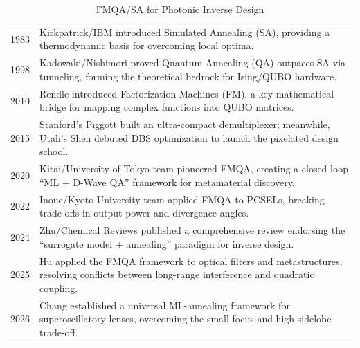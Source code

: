 \begin{table}[H] 
\centering
\begin{tabularx}{\textwidth}{l | >{\linespread{1.0}\selectfont\arraybackslash}X}
\hline \rule{0pt}{1.8em}1983 & Kirkpatrick/IBM introduced Simulated Annealing (SA), providing a thermodynamic basis for overcoming local optima.\cite{kirkpatrick1983_simulated_annealing} \\[1.5em]

1998 & Kadowaki/Nishimori proved Quantum Annealing (QA) outpaces SA via tunneling, forming the theoretical bedrock for Ising/QUBO hardware.\cite{kadowaki1998_quantum_annealing} \\[1.5em]

2010 & Rendle introduced Factorization Machines (FM), a key mathematical bridge for mapping complex functions into QUBO matrices.\cite{rendle2010_factorization} \\[1.5em]

2015 & Stanford's Piggott built an ultra-compact demultiplexer; meanwhile, Utah's Shen debuted DBS optimization to launch the pixelated design school.\cite{piggott2015_inverse_design,shen2015_integrated_pbs} \\[1.5em]

2020 & Kitai/University of Tokyo team pioneered FMQA, creating a closed-loop ``ML + D-Wave QA'' framework for metamaterial discovery.\cite{kitai2020_fmqa} \\[1.5em]

2022 & Inoue/Kyoto University team applied FMQA to PCSELs, breaking trade-offs in output power and divergence angles.\cite{inoue2022_fmqa_pcsel} \\[1.5em]

2024 & Zhu/Chemical Reviews published a comprehensive review endorsing the ``surrogate model + annealing'' paradigm for inverse design.\cite{zhu2024_machine_learning} \\[1.5em]

2025 & Hu applied the FMQA framework to optical filters and metastructures, resolving conflicts between long-range interference and quadratic coupling.\cite{hu2025_optical_filter} \\[1.5em]

2026 & Chang established a universal ML-annealing framework for superoscillatory lenses, overcoming the small-focus and high-sidelobe trade-off.\cite{chang2026_quantum_compatible} \\
\hline
\end{tabularx}
\caption{FMQA/SA for Photonic Inverse Design}
\label{tab:fmqa_sa}
\end{table}
\clearpage

